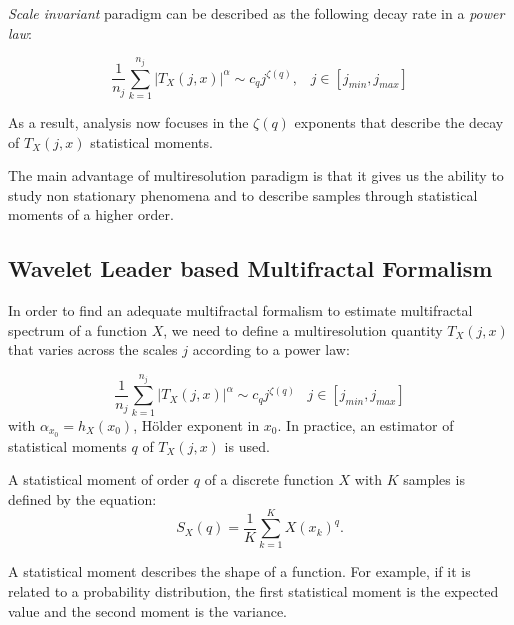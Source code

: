 \documentclass{article}
\begin{document}
\textit{Scale invariant} paradigm can be described as the following decay rate in a \textit{power law}:

\begin{equation}
	\frac{1}{n_j}\displaystyle\sum_{k=1}^{n_j}|T_X(j, x)|^{\alpha} \sim c_qj^{\zeta (q)}, \;\;\; j \in \left[ j_{min}, j_{max}\right] 
\end{equation}

As a result, analysis now focuses in the $\zeta(q)$ exponents that describe the decay of $T_X(j, x)$ statistical moments.

The main advantage of multiresolution paradigm is that it gives us the ability to study non stationary phenomena and to describe samples through statistical moments of a higher order. 

\subsection{Wavelet Leader based Multifractal Formalism}

In order to find an adequate multifractal formalism to estimate multifractal spectrum of a function $X$, we need to define a multiresolution quantity $T_X(j, x)$ that varies across the scales $j$ according to a power law:

\begin{equation}\label{decay_power_law}
	\frac{1}{n_j}\displaystyle\sum_{k=1}^{n_j}|T_X(j, x)|^{\alpha} \sim c_qj^{\zeta (q)} \;\;\; j \in \left[ j_{min}, j_{max}\right] 
\end{equation}
with $\alpha_{x_0} = h_X(x_0)$, H\"older exponent in $x_0$. In practice, an estimator of statistical moments $q$ of $T_X(j, x)$ is used. 

\begin{center}
	A statistical moment of order $q$ of a discrete function $X$ with $K$ samples is defined by the equation:
	\begin{equation}\label{statistical_moment}
		S_X(q) = \frac{1}{K}\displaystyle \sum_{k=1}^{K} X(x_k)^q.
	\end{equation}
\end{center}

A statistical moment describes the shape of a function. For example, if it is related to a probability distribution, the first statistical moment is the expected value and the second moment is the variance.
\end{document}

